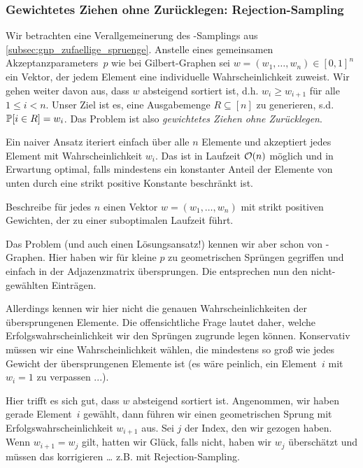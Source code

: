 \subsubsection{Gewichtetes Ziehen ohne Zurücklegen: Rejection-Sampling}
Wir betrachten eine Verallgemeinerung des \Gnp-Samplings aus \cref{subsec:gnp_zufaellige_spruenge}.
Anstelle eines gemeinsamen Akzeptanzparameters~$p$ wie bei Gilbert-Graphen sei $w = (w_1, \ldots, w_n) \in [0, 1]^n$ ein Vektor, der jedem Element eine individuelle Wahrscheinlichkeit zuweist.
Wir gehen weiter davon aus, dass $w$ absteigend sortiert ist, d.h. $w_i \ge w_{i+1}$ für alle $1 \le i < n$.
Unser Ziel ist es, eine Ausgabemenge $R \subseteq [n]$ zu generieren, s.d. $\mathbb{P}\!\left[i \in R\right] = w_i$.
Das Problem ist also \emph{gewichtetes Ziehen ohne Zurücklegen}.

Ein naiver Ansatz iteriert einfach über alle $n$ Elemente und akzeptiert jedes Element mit Wahrscheinlichkeit $w_i$.
Das ist in Laufzeit $\mathcal{O}\!\left(n\right)$ möglich und in Erwartung optimal, falls mindestens ein konstanter Anteil der Elemente von unten durch eine strikt positive Konstante beschränkt ist.
\begin{exercise}
    Beschreibe für jedes $n$ einen Vektor $w = (w_1, \ldots, w_n)$ mit strikt positiven Gewichten, der zu einer suboptimalen Laufzeit führt.
\end{exercise}

Das Problem (und auch einen Lösungsansatz!) kennen wir aber schon von \Gnp-Graphen.
Hier haben wir für kleine $p$ zu geometrischen Sprüngen gegriffen und einfach  in der Adjazenzmatrix übersprungen.
Die  entsprechen nun den nicht-gewählten Einträgen.

Allerdings kennen wir hier nicht die genauen Wahrscheinlichkeiten der übersprungenen Elemente.
Die offensichtliche Frage lautet daher, welche Erfolgswahrscheinlichkeit wir den Sprüngen zugrunde legen können.
Konservativ müssen wir eine Wahrscheinlichkeit wählen, die mindestens so groß wie jedes Gewicht der übersprungenen Elemente ist (es wäre peinlich, ein Element~$i$ mit $w_i = 1$ zu verpassen ...).

Hier trifft es sich gut, dass $w$ absteigend sortiert ist.
Angenommen, wir haben gerade Element~$i$ gewählt, dann führen wir einen geometrischen Sprung mit Erfolgswahrscheinlichkeit $w_{i+1}$ aus.
Sei $j$ der Index, den wir gezogen haben.
Wenn $w_{i+1} = w_j$ gilt, hatten wir Glück, falls nicht, haben wir $w_j$ überschätzt und müssen das korrigieren \ldots{} z.B. mit Rejection-Sampling.


